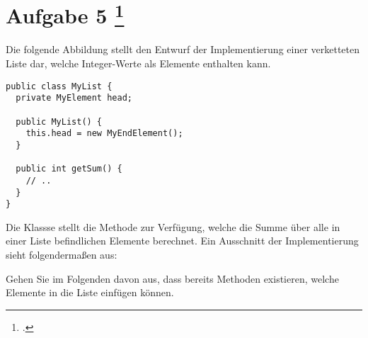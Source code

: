 \documentclass{lehramt-informatik-aufgabe}
\begin{document}
\let\j=\liJavaCode

\section{Aufgabe 5
\footcite{examen:66116:2021:03}}

Die folgende Abbildung stellt den Entwurf der Implementierung einer
verketteten Liste dar, welche Integer-Werte als Elemente enthalten kann.

\begin{center}
\end{center}

\begin{verbatim}
public class MyList {
  private MyElement head;

  public MyList() {
    this.head = new MyEndElement();
  }

  public int getSum() {
    // ..
  }
}

\end{verbatim}

Die Klassse \j{MyList} stellt die Methode \j{getSum()} zur Verfügung,
welche die Summe über alle in einer Liste befindlichen Elemente
berechnet. Ein Ausschnitt der Implementierung sieht folgendermaßen aus:

Gehen Sie im Folgenden davon aus, dass bereits Methoden existieren,
welche Elemente in die Liste einfügen können.
\end{document}
